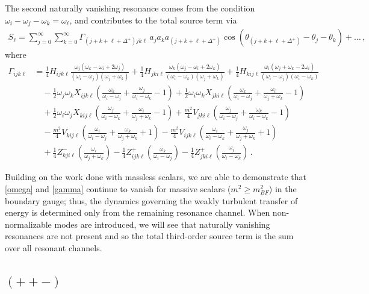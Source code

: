 \documentclass[letterpaper,11pt]{article}
\newcommand{\oi}{\omega_i}
\newcommand{\oj}{\omega_j}
\newcommand{\ok}{\omega_k}
\newcommand{\ol}{\omega_\ell}
\newcommand{\thj}{\theta_j}
\newcommand{\thk}{\theta_k}
\begin{document}
The second naturally vanishing resonance comes from the condition $\oi - \oj - \ok = \ol$, and contributes to the total source term via
\begin{align}
S_\ell = \sum_{j=0}^\infty \sum_{k=0}^\infty \Gamma_{(j + k + \ell + \Delta^+) jk\ell} \, a_j a_k a_{(j+k+\ell + \Delta^+)} \cos \left( \theta_{(j+k+\ell + \Delta^+)} - \thj - \thk \right) + \ldots \, ,
\end{align}
where
\begin{align}
\label{gamma}
\Gamma_{ijk\ell} &= \frac{1}{4} H_{ijk\ell} \frac{\oj (\ok - \oi + 2\oj)}{(\oi - \oj)(\oj + \ok)} + \frac{1}{4} H_{jki\ell} \frac{\ok (\oj - \oi + 2\ok)}{(\oi - \ok)(\oj + \ok)} + \frac{1}{4} H_{kij\ell} \frac{\oi (\oj + \ok - 2\oi)}{(\oi - \oj)(\oi - \ok)} \nonumber \\
% 
& \quad -\frac{1}{2} \oj \ok X_{ijk\ell} \left( \frac{\ok}{\oi - \oj} + \frac{\oj}{\oi - \ok} - 1\right) + \frac{1}{2} \oi \ok X_{jki\ell} \left( \frac{\ok}{\oi - \oj} + \frac{\oi}{\oj + \ok} - 1 \right) \nonumber \\
%
& \quad + \frac{1}{2} \oi \oj X_{kij\ell} \left( \frac{\oj}{\oi - \ok} + \frac{\oi}{\oj + \ok} -1 \right) + \frac{m^2}{4} V_{jki\ell} \left( \frac{\oj}{\oi - \oj} + \frac{\ok}{\oi - \ok} -1\right) \nonumber \\
%
& \quad - \frac{m^2}{4} V_{kij\ell} \left( \frac{\oi}{\oi - \oj} + \frac{\ok}{\oj + \ok} + 1\right) - \frac{m^2}{4} V_{ijk\ell} \left( \frac{\oi}{\oi - \ok} + \frac{\oj}{\oj + \ok} + 1 \right) \nonumber \\
%
& \quad + \frac{1}{4} Z^-_{kji\ell} \left( \frac{\oi}{\oj + \ok}\right) - \frac{1}{4} Z^+_{ijk\ell} \left( \frac{\ok}{\oi - \oj} \right) - \frac{1}{4} Z^+_{jki\ell} \left( \frac{\oj}{\oi - \ok}\right) \, .
\end{align}

Building on the work done with massless scalars, we are able to demonstrate that \eqref{omega} and \eqref{gamma} continue to vanish for massive scalars ($m^2 \geq m^2_{BF}$) in the boundary gauge; thus, the dynamics governing the weakly turbulent transfer of energy is determined only from the remaining resonance channel. When non-normalizable modes are introduced, we will see that naturally vanishing resonances are not present and so the total third-order source term is the sum over all resonant channels.


\subsection{$(++-)$}
\label{subs: ttf resonances}
\end{document}
